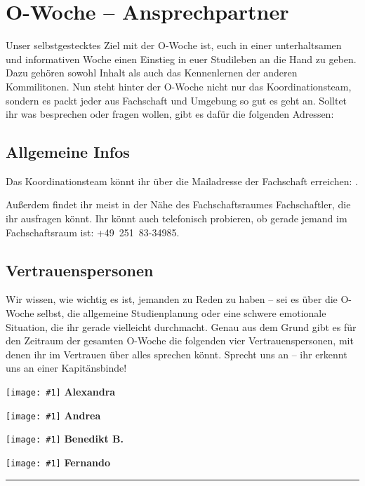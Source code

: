 \newcommand{\fibelvp}[2]{
	\minipage{0.24\textwidth}
		\begin{centering}
			\texttt{[image: \#1]}
			\textbf{#2}
		\end{centering}
	\endminipage\hfill
}

\section{O-Woche -- Ansprechpartner}

Unser selbstgestecktes Ziel mit der O-Woche ist, euch in einer unterhaltsamen und informativen Woche einen
Einstieg in euer Studileben an die Hand zu geben. Dazu gehören sowohl Inhalt als auch das Kennenlernen der
anderen Kommilitonen. Nun steht hinter der O-Woche nicht nur das Koordinationsteam, sondern es packt jeder
aus Fachschaft und Umgebung so gut es geht an. Solltet ihr was besprechen oder fragen wollen, gibt es dafür die
folgenden Adressen:

\subsection{Allgemeine Infos}
Das Koordinationsteam könnt ihr über die Mailadresse der Fachschaft erreichen: .

Außerdem findet ihr meist in der Nähe des Fachschaftsraumes Fachschaftler, die ihr ausfragen könnt. Ihr könnt
auch telefonisch probieren, ob gerade jemand im Fachschaftsraum ist: +49~251~83-34985.

\subsection{Vertrauenspersonen}
Wir wissen, wie wichtig es ist, jemanden zu Reden zu haben -- sei es über die O-Woche selbst, die
allgemeine Studienplanung oder eine schwere emotionale Situation, die ihr gerade vielleicht durchmacht. Genau aus dem Grund
gibt es für den Zeitraum der gesamten O-Woche die folgenden vier Vertrauenspersonen, mit denen ihr im Vertrauen über
alles sprechen könnt. Sprecht uns an -- ihr erkennt uns an einer Kapitänsbinde!

\fibelvp{res/vorstellungsfotos/alexandra_everwand.png}{Alexandra}
\fibelvp{res/vorstellungsfotos/andrea_garner_cropped.JPG}{Andrea}
\fibelvp{res/vorstellungsfotos/benedikt_bieringer.png}{Benedikt B.}
\fibelvp{res/vorstellungsfotos/fernando_romahn.png}{Fernando}

\rule{2cm}{0.4pt}

\fibelnotesimgsmall
